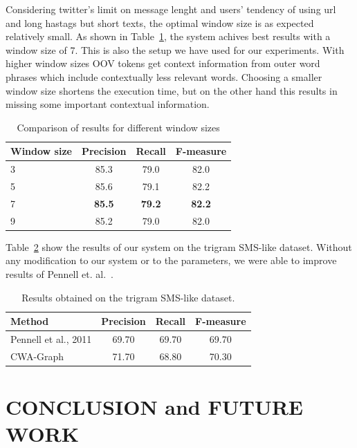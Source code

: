 \documentclass[a4paper,onesided,12pt]{report}
\begin{document}
Considering twitter's limit on message lenght and users' tendency of using url and long hastags but short texts, the optimal window size is as expected relatively small. As shown in Table~\ref{tab:windows}, the system achives best results with a window size of 7. This is also the setup we have used for our experiments. With higher window sizes OOV tokens get context information from outer word phrases which include contextually less relevant words. Choosing a smaller window size shortens the execution time, but on the other hand this results in missing some important contextual information.

\begin{table}[thb]
  \caption{Comparison of results for different window sizes}
  \centering
  \begin{tabular}[th]{lccc}
    \hline
    Window size & Precision & Recall & F-measure \\
    \hline
    3 & 85.3 & 79.0 & 82.0 \\
    5 & 85.6 & 79.1 & 82.2 \\
    7 & \textbf{85.5} &  \textbf{79.2} &  \textbf{82.2} \\
    9 & 85.2 & 79.0  & 82.0 \\
    \hline
  \end{tabular}
\label{tab:windows}
\end{table}

Table~\ref{tab:resultspennell} show the results of our system on the trigram SMS-like dataset. Without any modification to our system or to the parameters, we were able to improve results of Pennell et. al.~\cite{pennell2011character}.

\begin{table}[thb]
  \caption{Results obtained on the trigram SMS-like dataset.}
  \centering
  \begin{tabular}[t]{lccc}
    \hline
    Method & Precision & Recall & F-measure \\
    \hline
    Pennell et al., 2011 & 69.70 & 69.70 & 69.70 \\
    CWA-Graph   & 71.70 & 68.80 & 70.30 \\
    \hline
  \end{tabular}
  \label{tab:resultspennell}
\end{table}

\chapter{CONCLUSION and FUTURE WORK}
\end{document}
